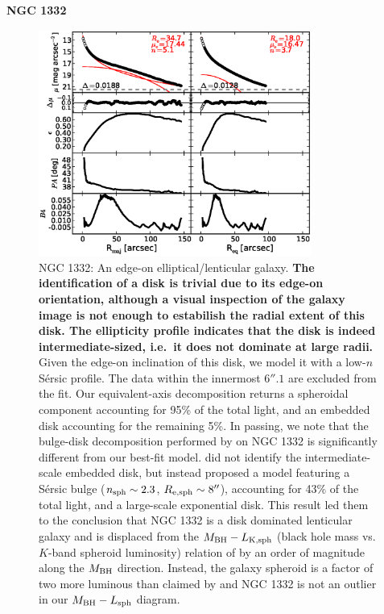 \documentclass[preprint2]{emulateapj}
\newcommand{\fitfigurewidth}{0.8\textwidth}
\begin{document}
  \clearpage\newpage\noindent
  {\bf NGC 1332 \\}

  \begin{figure}[h]
  \begin{center}
  \includegraphics[width=\fitfigurewidth]{images/n1332_1Dfit.eps}
  \caption{NGC 1332: 
  An edge-on elliptical/lenticular galaxy. 
  {\bf The identification of a disk is trivial due to its edge-on orientation, 
  although a visual inspection of the galaxy image is not enough to estabilish the radial extent of this disk. 
  The ellipticity profile indicates that the disk is indeed intermediate-sized, i.e.~it does not dominate at large radii. }
  Given the edge-on inclination of this disk, we model it with a low-$n$ S\'ersic profile. 
  The data within the innermost $6''.1$ are excluded from the fit.
  Our equivalent-axis decomposition returns a spheroidal component accounting for 95\% of the total light,
  and an embedded disk accounting for the remaining 5\%.
  In passing, we note that the bulge-disk decomposition performed by \citet{rusli2011} on NGC 1332 
  is significantly different from our best-fit model.
  \citet{rusli2011} did not identify the intermediate-scale embedded disk, 
  but instead proposed a model featuring a S\'ersic bulge ($n_{\rm sph} \sim 2.3$, $R_{\rm e,sph} \sim 8''$), accounting for 43\% of the total light, 
  and a large-scale exponential disk. 
  This result led them to the conclusion that NGC 1332 is a disk dominated lenticular galaxy 
  and is displaced from the $M_{\rm BH} - L_{\rm K,sph}$ (black hole mass vs. $K$-band spheroid luminosity) relation of \citet{marconihunt2003} 
  by an order of magnitude along the $M_{\rm BH}$ direction.
  Instead, the galaxy spheroid is a factor of two more luminous than claimed by \citet{rusli2011} and  
  NGC 1332 is not an outlier in our $M_{\rm BH} - L_{\rm sph}$ diagram. \\
  }
  \end{center}
  \end{figure}
\end{document}
